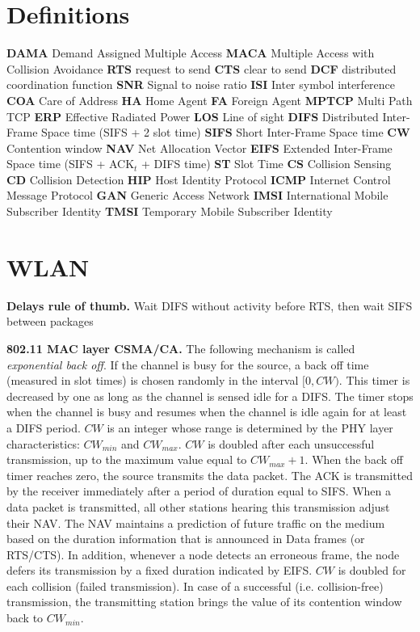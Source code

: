 \documentclass[10pt,twocolumn]{article}
\renewcommand{\bf}{\textbf}
\newcommand{\define}[2]{{\large \textbf{#1}} #2}
\begin{document}
\setlength{\abovedisplayskip}{.3em}
\setlength{\belowdisplayskip}{.3em}

\section{Definitions}

\define{DAMA}{Demand Assigned Multiple Access}
\define{MACA}{Multiple Access with Collision Avoidance}
\define{RTS}{request to send}
\define{CTS}{clear to send}
\define{DCF}{distributed coordination function}
\define{SNR}{Signal to noise ratio}
\define{ISI}{Inter symbol interference}
\define{COA}{Care of Address}
\define{HA}{Home Agent}
\define{FA}{Foreign Agent}
\define{MPTCP}{Multi Path TCP}
\define{ERP}{Effective Radiated Power}
\define{LOS}{Line of sight}
\define{DIFS}{Distributed Inter-Frame Space time (SIFS + 2 slot time)}
\define{SIFS}{Short Inter-Frame Space time}
\define{CW}{Contention window}
\define{NAV}{Net Allocation Vector}
\define{EIFS}{Extended Inter-Frame Space time (SIFS + ACK$_{t}$ + DIFS time)}
\define{ST}{Slot Time}
\define{CS}{Collision Sensing}
\define{CD}{Collision Detection}
\define{HIP}{Host Identity Protocol}
\define{ICMP}{Internet Control Message Protocol}
\define{GAN}{Generic Access Network}
\define{IMSI}{International Mobile Subscriber Identity}
\define{TMSI}{Temporary Mobile Subscriber Identity}


\section{WLAN}

\bf{Delays rule of thumb.} Wait DIFS without activity before RTS, then wait SIFS between packages

\bf{802.11 MAC layer CSMA/CA.} The following mechanism is called \emph{exponential back off}. If the channel is busy for the source, a back off time (measured in slot times) is chosen randomly in the interval $[0,CW)$. This timer is decreased by one as long as the channel is sensed idle for a DIFS. The timer stops when the channel is busy and resumes when the channel is idle again for at least a DIFS period. $CW$ is an integer whose range is determined by the PHY layer characteristics: $CW_{min}$ and $CW_{max}$. $CW$ is doubled after each unsuccessful transmission, up to the maximum value equal to $CW_{max} + 1$. When the back off timer reaches zero, the source transmits the data packet. The ACK is transmitted by the receiver immediately after a period of duration equal to SIFS. When a data packet is transmitted, all other stations hearing this transmission adjust their NAV. The NAV maintains a prediction of future traffic on the medium based on the duration information that is announced in Data frames (or RTS/CTS). In addition, whenever a node detects an erroneous frame, the node defers its transmission by a fixed duration indicated by EIFS. $CW$ is doubled for each collision (failed transmission). In case of a successful (i.e. collision-free) transmission, the transmitting station brings the value of its contention window back to $CW_{min}$.
\end{document}
